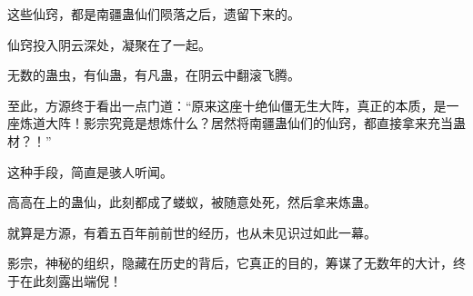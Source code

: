 \begin{this_body}
这些仙窍，都是南疆蛊仙们陨落之后，遗留下来的。

仙窍投入阴云深处，凝聚在了一起。

无数的蛊虫，有仙蛊，有凡蛊，在阴云中翻滚飞腾。

至此，方源终于看出一点门道：“原来这座十绝仙僵无生大阵，真正的本质，是一座炼道大阵！影宗究竟是想炼什么？居然将南疆蛊仙们的仙窍，都直接拿来充当蛊材？！”

这种手段，简直是骇人听闻。

高高在上的蛊仙，此刻都成了蝼蚁，被随意处死，然后拿来炼蛊。

就算是方源，有着五百年前前世的经历，也从未见识过如此一幕。

影宗，神秘的组织，隐藏在历史的背后，它真正的目的，筹谋了无数年的大计，终于在此刻露出端倪！

\end{this_body}

